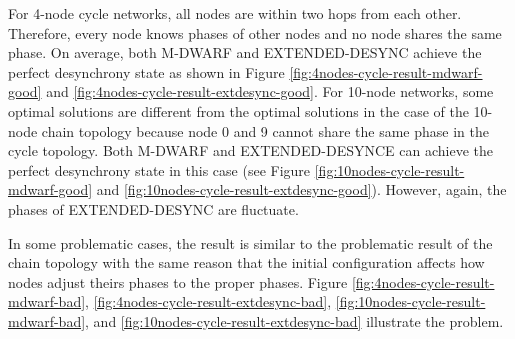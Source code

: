 For 4-node cycle networks, all nodes are within two hops from each other. Therefore, every node knows phases of other nodes and no node shares the same phase. On average, both M-DWARF and EXTENDED-DESYNC achieve the perfect desynchrony state as shown in Figure \ref{fig:4nodes-cycle-result-mdwarf-good} and \ref{fig:4nodes-cycle-result-extdesync-good}. For 10-node networks, some optimal solutions are different from the optimal solutions in the case of the 10-node chain topology because node 0 and 9 cannot share the same phase in the cycle topology. Both M-DWARF and EXTENDED-DESYNCE can achieve the perfect desynchrony state in this case (see Figure \ref{fig:10nodes-cycle-result-mdwarf-good} and \ref{fig:10nodes-cycle-result-extdesync-good}). However, again, the phases of EXTENDED-DESYNC are fluctuate.

In some problematic cases, the result is similar to the problematic result of the chain topology with the same reason that the initial configuration affects how nodes adjust theirs phases to the proper phases. Figure \ref{fig:4nodes-cycle-result-mdwarf-bad}, \ref{fig:4nodes-cycle-result-extdesync-bad}, \ref{fig:10nodes-cycle-result-mdwarf-bad}, and \ref{fig:10nodes-cycle-result-extdesync-bad} illustrate the problem.


